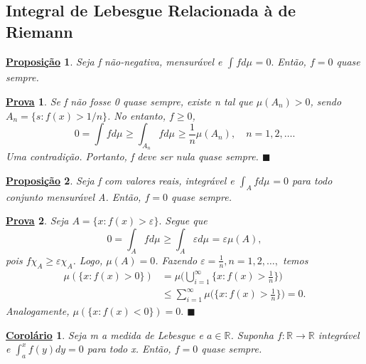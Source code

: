 \documentclass{article}
\newtheorem*{prop*}{\underline{Proposi\c c\~ao}}
\newtheorem*{proof*}{\underline{Prova}}
\newtheorem*{crl*}{\underline{Corolário}}
\renewcommand\qedsymbol{$\blacksquare$}
\begin{document}
\subsection{Integral de Lebesgue Relacionada à de Riemann}
 \begin{prop*}
   Seja f não-negativa, mensurável e \(\int_{}f d\mu_{} = 0.\) Então, \(f=0\) quase sempre.
 \end{prop*}
 \begin{proof*}
   Se f não fosse 0 quase sempre, existe n tal que \(\mu (A_{n}) > 0\), sendo \(A_{n} = \{s: f(x) > 1/n\}\). No entanto, \(f\geq 0\),
     \[
       0 = \int_{}f d\mu_{} \geq \int_{A_{n}}f d\mu_{} \geq \frac{1}{n}\mu (A_{n}),\quad n = 1, 2, \dotsc .
     \]
    Uma contradição. Portanto, f deve ser nula quase sempre. \qedsymbol
 \end{proof*}
\begin{prop*}
  Seja f com valores reais, integrável  e \(\int_{A}f d\mu_{} = 0\) para todo conjunto mensurável A. Então, \(f=0\) quase sempre.
\end{prop*}
\begin{proof*}
  Seja \(A = \{x: f(x) > \varepsilon \}.\) Segue que 
    \[
      0 = \int_{A}f d\mu_{} \geq \int_{A}\varepsilon  d\mu_{} = \varepsilon \mu (A),
    \]
  pois \(f \chi_{A} \geq \varepsilon \chi_{A}\). Logo, \(\mu (A) = 0\). Fazendo \(\varepsilon  = \frac{1}{n}, n = 1, 2, \dotsc ,\) temos 
 \begin{align*}
   \mu (\{x:f(x) > 0\}) &= \mu \biggl(\bigcup_{i=1}^{\infty}\biggl\{x: f(x) > \frac{1}{n}\biggr\}\biggr)\\ 
                        &\leq \sum\limits_{i=1}^{\infty}\mu \biggl(\biggl\{x:f(x)>\frac{1}{n}\biggr\}\biggr) = 0.
 \end{align*}
 Analogamente, \(\mu (\{x:f(x)<0\}) = 0.\) \qedsymbol
\end{proof*}
\begin{crl*}
  Seja m a medida de Lebesgue e \(a\in \mathbb{R}\). Suponha \(f:\mathbb{R}\rightarrow \mathbb{R}\) integrável e \(\int_{a}^{x}f(y)dy = 0\) para todo x. Então, \(f=0\) quase sempre.
\end{crl*}
\end{document}
